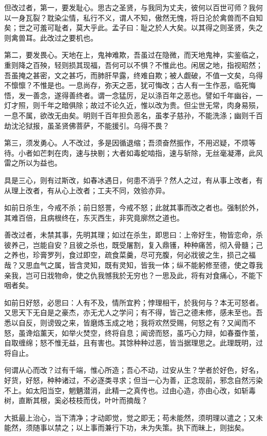 \documentclass[letterpaper,12pt,english]{sphinxmanual}
\begin{document}
但改过者，第一，要发耻心。思古之圣贤，与我同为丈夫，彼何以百世可师？我何以一身瓦裂？耽染尘情，私行不义，谓人不知，傲然无愧，将日沦於禽兽而不自知矣；世之可羞可耻者，莫大乎此。孟子曰：耻之於人大矣。以其得之则圣贤，失之则禽兽耳。此改过之要机也。

第二，要发畏心。天地在上，鬼神难欺，吾虽过在隐微，而天地鬼神，实鉴临之，重则降之百殃，轻则损其现福，吾何可以不惧？不惟此也。闲居之地，指视昭然；吾虽掩之甚密，文之甚巧，而肺肝早露，终难自欺；被人觑破，不值一文矣，乌得不懔懔？不惟是也。一息尚存，弥天之恶，犹可悔改；古人有一生作恶，临死悔悟，发一善念，遂得善终者。谓一念猛厉，足以涤百年之恶也。譬如千年幽谷，一灯才照，则千年之暗俱除；故过不论久近，惟以改为贵。但尘世无常，肉身易殒，一息不属，欲改无由矣。明则千百年担负恶名，虽孝子慈孙，不能洗涤；幽则千百劫沈沦狱报，虽圣贤佛菩萨，不能援引。乌得不畏？

第三，须发勇心。人不改过，多是因循退缩；吾须奋然振作，不用迟疑，不烦等待。小者如芒刺在肉，速与抉剔；大者如毒蛇啮指，速与斩除，无丝毫凝滞，此风雷之所以为益也。

具是三心，则有过斯改，如春冰遇日，何患不消乎？然人之过，有从事上改者，有从理上改者，有从心上改者；工夫不同，效验亦异。

如前日杀生，今戒不杀；前日怒詈，今戒不怒；此就其事而改之者也。强制於外，其难百倍，且病根终在，东灭西生，非究竟廓然之道也。

善改过者，未禁其事，先明其理；如过在杀生，即思曰：上帝好生，物皆恋命，杀彼养己，岂能自安？且彼之杀也，既受屠割，复入鼎镬，种种痛苦，彻入骨髓；己之养也，珍膏罗列，食过即空，疏食菜羹，尽可充腹，何必戕彼之生，损己之福哉？又思血气之属，皆含灵知，既有灵知，皆我一体；纵不能躬修至德，使之尊我亲我，岂可日戕物命，使之仇我憾我於无穷也？一思及此，将有对食痛心，不能下咽者矣。

如前日好怒，必思曰：人有不及，情所宜矜；悖理相干，於我何与？本无可怒者。又思天下无自是之豪杰，亦无尤人之学问；有不得，皆己之德未修，感未至也。吾悉以自反，则谤毁之来，皆磨炼玉成之地；我将欢然受赐，何怒之有？又闻而不怒，虽谗焰薰天，如举火焚空，终将自息；闻谤而怒，虽巧心力辩，如春蚕作茧，自取缠绵；怒不惟无益，且有害也。其馀种种过恶，皆当据理思之。此理既明，过将自止。

何谓从心而改？过有千端，惟心所造；吾心不动，过安从生？学者於好色，好名，好货，好怒，种种诸过，不必逐类寻求；但当一心为善，正念现前，邪念自然污染不上。如太阳当空，魍魉潜消，此精一之真传也。过由心造，亦由心改，如斩毒树，直断其根，奚必枝枝而伐，叶叶而摘哉？

大抵最上治心，当下清净；才动即觉，觉之即无；苟未能然，须明理以遣之；又未能然，须随事以禁之；以上事而兼行下功，未为失策。执下而昧上，则拙矣。
\end{document}
